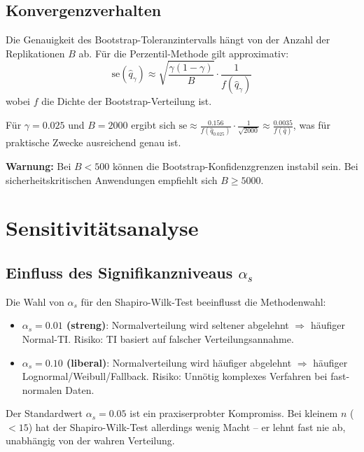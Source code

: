 \documentclass[10pt,a4paper,twocolumn]{article}
\theoremstyle{definition}
\newcommand{\warnung}[1]{%
    \begin{center}
    \colorbox{warnred}{\parbox{0.92\linewidth}{\small\textbf{Warnung:} #1}}
    \end{center}
}
\newcommand{\TI}{Toleranzintervall}
\begin{document}
\subsection{Konvergenzverhalten}

Die Genauigkeit des Bootstrap-\TI{}s hängt von der Anzahl
der Replikationen $B$ ab. Für die Perzentil-Methode gilt
approximativ:
\begin{equation}
    \text{se}(\hat{q}_\gamma) \approx
    \sqrt{\frac{\gamma(1-\gamma)}{B}} \cdot
    \frac{1}{f(\hat{q}_\gamma)}
    \label{eq:bootstrap_se}
\end{equation}
wobei $f$ die Dichte der Bootstrap-Verteilung ist.

Für $\gamma = 0.025$ und $B = 2000$ ergibt sich
$\text{se} \approx \frac{0.156}{f(\hat{q}_{0.025})} \cdot
\frac{1}{\sqrt{2000}} \approx \frac{0.0035}{f(\hat{q})}$,
was für praktische Zwecke ausreichend genau ist.

\warnung{Bei $B < 500$ können die Bootstrap-Konfidenzgrenzen
instabil sein. Bei sicherheitskritischen Anwendungen empfiehlt
sich $B \geq 5000$.}


\section{Sensitivitätsanalyse}
\label{sec:sensitivitaet}

\subsection{Einfluss des Signifikanzniveaus $\alpha_s$}

Die Wahl von $\alpha_s$ für den Shapiro-Wilk-Test beeinflusst
die Methodenwahl:

\begin{itemize}[nosep,leftmargin=*]
    \item \textbf{$\alpha_s = 0.01$ (streng)}: Normalverteilung
        wird seltener abgelehnt $\Rightarrow$ häufiger Normal-TI.
        Risiko: TI basiert auf falscher Verteilungsannahme.
    \item \textbf{$\alpha_s = 0.10$ (liberal)}: Normalverteilung
        wird häufiger abgelehnt $\Rightarrow$ häufiger
        Lognormal/Weibull/Fallback. Risiko: Unnötig komplexes
        Verfahren bei fast-normalen Daten.
\end{itemize}

Der Standardwert $\alpha_s = 0.05$ ist ein praxiserprobter
Kompromiss. Bei kleinem $n$ ($< 15$) hat der Shapiro-Wilk-Test
allerdings wenig Macht -- er lehnt fast nie ab, unabhängig von
der wahren Verteilung.
\end{document}
